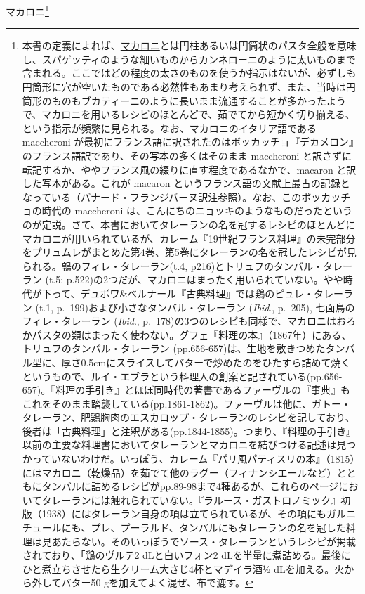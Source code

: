 マカロニ\footnote{本書の定義によれば、\protect\hyperlink{macaroni}{マカロニ}とは円柱あるいは円筒状のパスタ全般を意味し、スパゲッティのような細いものからカンネローニのように太いものまで含まれる。ここではどの程度の太さのものを使うか指示はないが、必ずしも円筒形に穴が空いたものである必然性もあまり考えられず、また、当時は円筒形のものもブカティーニのように長いまま流通することが多かったようで、マカロニを用いるレシピのほとんどで、茹でてから短かく切り揃える、という指示が頻繁に見られる。なお、マカロニのイタリア語である
  maccheroni
  が最初にフランス語に訳されたのはボッカッチョ『デカメロン』のフランス語訳であり、その写本の多くはそのまま
  maccheroni
  と訳さずに転記するか、ややフランス風の綴りに直す程度であるなかで、macaron
  と訳した写本がある。これが macaron
  というフランス語の文献上最古の記録となっている（\protect\hyperlink{panade-frangipane}{パナード・フランジパーヌ}訳注参照）。なお、このボッカッチョの時代の
  maccheroni
  は、こんにちのニョッキのようなものだったというのが定説。さて、本書においてタレーランの名を冠するレシピのほとんどにマカロニが用いられているが、カレーム『19世紀フランス料理』の未完部分をプリュムレがまとめた第4巻、第5巻にタレーランの名を冠したレシピが見られる。鶉のフィレ・タレーラン(t.4,
  p216)とトリュフのタンバル・タレーラン (t.5;
  p.522)の2つだが、マカロニはまったく用いられていない。やや時代が下って、デュボワ\&ベルナール『古典料理』では鶏のピュレ・タレーラン
  (t.1, p.~199)および小さなタンバル・タレーラン (\emph{Ibid}., p.~205),
  七面鳥のフィレ・タレーラン (\emph{Ibid}.,
  p.~178)の3つのレシピも同様で、マカロニはおろかパスタの類はまったく使わない。グフェ『料理の本』（1867年）にある、トリュフのタンバル・タレーラン
  (pp.656-657)は、生地を敷きつめたタンバル型に、厚さ0.5cmにスライスしてバターで炒めたのをひたすら詰めて焼くというもので、ルイ・エブラという料理人の創案と記されている(pp.656-657)。『料理の手引き』とほぼ同時代の著書であるファーヴルの『事典』もこれをそのまま踏襲している(pp.1861-1862)。ファーヴルは他に、ガトー・タレーラン、肥鶏胸肉のエスカロップ・タレーランのレシピを記しており、後者は「古典料理」と注釈がある(pp.1844-1855)。つまり、『料理の手引き』以前の主要な料理書においてタレーランとマカロニを結びつける記述は見つかっていないわけだ。いっぽう、カレーム『パリ風パティスリの本』（1815）にはマカロニ（乾燥品）を茹でて他のラグー（フィナンシエールなど）とともにタンバルに詰めるレシピがpp.89-98まで4種あるが、これらのページにおいてタレーランには触れられていない。『ラルース・ガストロノミック』初版（1938）にはタレーラン自身の項は立てられているが、その項にもガルニチュールにも、プレ、プーラルド、タンバルにもタレーランの名を冠した料理は見あたらない。そのいっぽうでソース・タレーランというレシピが掲載されており、「鶏のヴルテ2
  dLと白いフォン2
  dLを半量に煮詰める。最後にひと煮立ちさせたら生クリーム大さじ4杯とマデイラ酒½
  dLを加える。火から外してバター50 gを加えてよく混ぜ、布で漉す。

}
